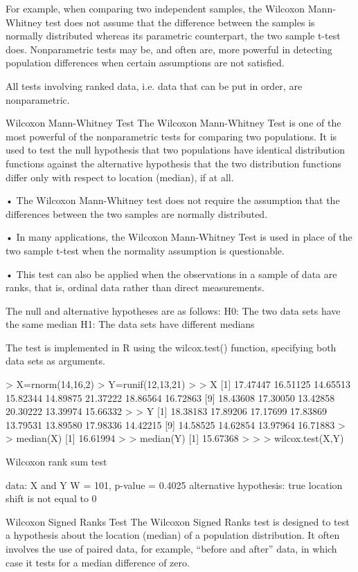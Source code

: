 For example, when comparing two independent samples, the Wilcoxon Mann-Whitney test does not assume that the difference between the samples is normally distributed whereas its parametric counterpart, the two sample t-test does. Nonparametric tests may be, and often are, more powerful in detecting population differences when certain assumptions are not satisfied.

All tests involving ranked data, i.e. data that can be put in order, are nonparametric.

 Wilcoxon Mann-Whitney Test
The Wilcoxon Mann-Whitney Test is one of the most powerful of the nonparametric tests for comparing two populations. It is used to test the null hypothesis that two populations have identical distribution functions against the alternative hypothesis that the two distribution functions differ only with respect to location (median), if at all.

•	The Wilcoxon Mann-Whitney test does not require the assumption that the differences between the two samples are normally distributed.

•	In many applications, the Wilcoxon Mann-Whitney Test is used in place of the two sample t-test when the normality assumption is questionable.

•	This test can also be applied when the observations in a sample of data are ranks, that is, ordinal data rather than direct measurements.

The null and alternative hypotheses are as follows:
H0: The two data sets have the same median
H1: The data sets have different medians

The test is implemented in R using the wilcox.test() function, specifying both data sets as arguments.

> X=rnorm(14,16,2)
> Y=runif(12,13,21)
> 
> X
 [1] 17.47447 16.51125 14.65513 15.82344 14.89875 21.37222 18.86564 16.72863
 [9] 18.43608 17.30050 13.42858 20.30222 13.39974 15.66332
> 
> Y
 [1] 18.38183 17.89206 17.17699 17.83869 13.79531 13.89580 17.98336 14.42215
 [9] 14.58525 14.62854 13.97964 16.71883
> 
> median(X)
[1] 16.61994
>
> median(Y)
[1] 15.67368
>
>
> wilcox.test(X,Y)

        Wilcoxon rank sum test

data:  X and Y 
W = 101, p-value = 0.4025
alternative hypothesis: true location shift is not equal to 0 



Wilcoxon Signed Ranks Test
The Wilcoxon Signed Ranks test is designed to test a hypothesis about the location (median) of a population distribution. It often involves the use of paired data, for example, “before and after” data, in which case it tests for a median difference of zero.

